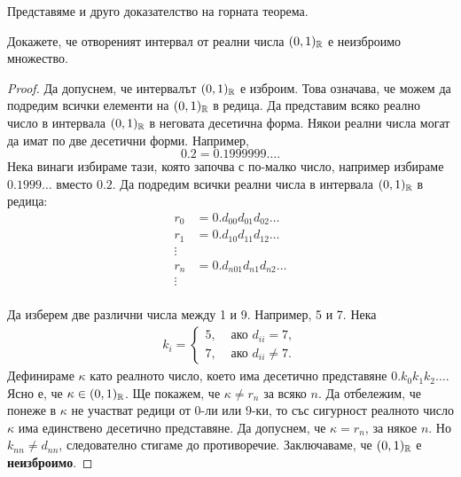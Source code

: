 
Представяме и друго доказателство на горната теорема.
\begin{problem}
  Докажете, че отвореният интервал от реални числа $(0,1)_{\mathbb{R}}$ е неизброимо множество.
\end{problem}
\begin{proof}
  Да допуснем, че интервалът $(0,1)_{\mathbb{R}}$ е изброим. Това означава, че можем да подредим всички елементи на $(0,1)_{\mathbb{R}}$ в редица.
  Да представим всяко реално число в интервала $(0,1)_{\mathbb{R}}$ в неговата десетична форма.
  Някои реални числа могат да имат по две десетични форми.
  Например, 
  \[0.2 = 0.1999999\dots.\]
  Нека винаги избираме тази, която започва с по-малко число, например избираме $0.1999\dots$ вместо $0.2$.
  Да подредим всички реални числа в интервала $(0,1)_{\mathbb{R}}$ в редица:
  \begin{align*}
    r_0 & = 0.d_{00}d_{01}d_{02}\dots\\
    r_1 & = 0.d_{10}d_{11}d_{12}\dots\\
    \vdots\\
    r_n & = 0.d_{n01}d_{n1}d_{n2}\dots\\
    \vdots\\
  \end{align*}

  Да изберем две различни числа между 1 и 9. Например, 5 и 7.
  Нека 
  \begin{align*}
    k_i = 
    \begin{cases}
      5, & \mbox{ ако } d_{ii} = 7,\\
      7, & \mbox{ ако } d_{ii} \neq 7.
    \end{cases}
  \end{align*}
  Дефинираме $\kappa$ като реалното число, което има десетично представяне $0.k_0k_1k_2\dots$.
  Ясно е, че $\kappa \in (0,1)_{\mathbb{R}}$. Ще покажем, че $\kappa \neq r_n$ за всяко $n$.
  Да отбележим, че понеже в $\kappa$ не участват редици от $0$-ли или $9$-ки, то със сигурност 
  реалното число $\kappa$ има единствено десетично представяне.
  Да допуснем, че $\kappa = r_n$, за някое $n$.
  Но $k_{nn} \neq d_{nn}$, следователно стигаме до противоречие.
  Заключаваме, че $(0,1)_{\mathbb{R}}$ е {\bf неизброимо}.
\end{proof}

